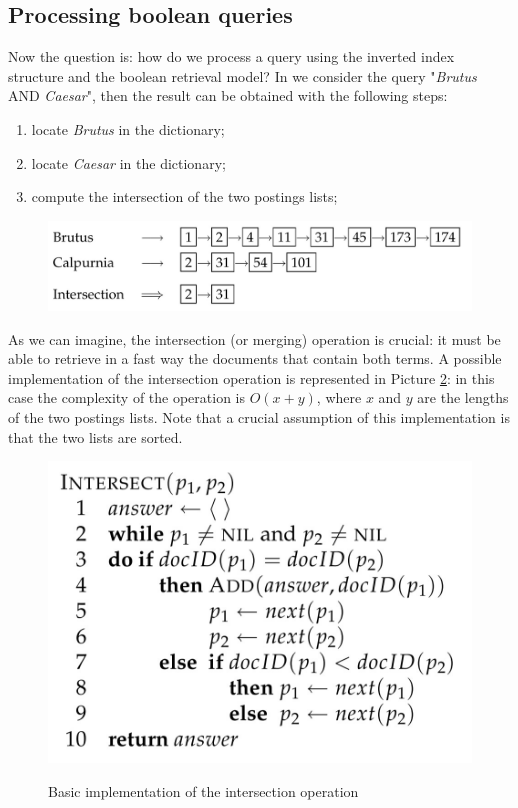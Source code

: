 \subsection{Processing boolean queries}
Now the question is: how do we process a query using the inverted index structure and the boolean retrieval model? In we consider the query "\textit{Brutus} AND \textit{Caesar}", then the result can be obtained with the following steps:

\begin{enumerate}
    \item locate \textit{Brutus} in the dictionary;
    \item locate \textit{Caesar} in the dictionary;
    \item compute the intersection of the two postings lists;
\end{enumerate}

\begin{figure}[h!]
		\centering
		\includegraphics[scale = 0.8]{img/boolean query_inv.jpg}
		\label{inc_ex}
\end{figure}

As we can imagine, the intersection (or merging) operation is crucial: it must be able to retrieve in a fast way the documents that contain both terms. A possible implementation of the intersection operation is represented in Picture \ref{intersection}: in this case the complexity of the operation is $O(x + y)$, where $x$ and $y$ are the lengths of the two postings lists. Note that a crucial assumption of this implementation is that the two lists are sorted.

\begin{figure}[h!]
		\centering
		\includegraphics[scale = 0.8]{img/intersection.jpg}
		\label{intersection}
        \caption{Basic implementation of the intersection operation}
\end{figure}

